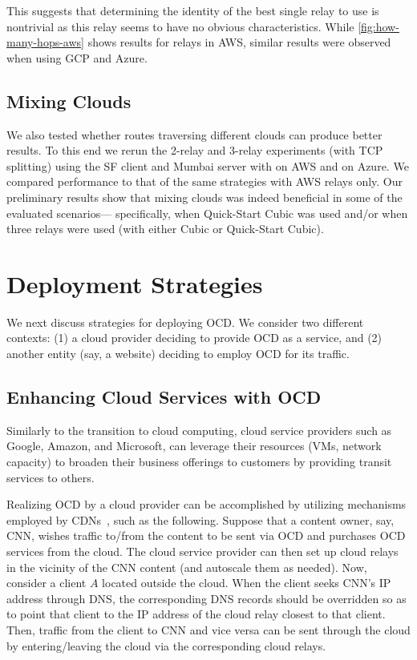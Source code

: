 \documentclass[10pt,sigconf]{acmart}
\begin{document}
This suggests that determining the identity of the best single relay to use is nontrivial as this relay seems to have no obvious characteristics. While \autoref{fig:how-many-hops-aws} shows results for relays in AWS, similar results were observed when using GCP and Azure.


\subsection{Mixing Clouds}

We also tested whether routes traversing different clouds can produce better results. To this end we rerun the 2-relay and 3-relay experiments (with TCP splitting) using the SF client and Mumbai server with \rc on AWS and \rs on Azure. We compared performance to that of the same strategies with AWS relays only. Our preliminary results show that mixing clouds was indeed beneficial in some of the evaluated scenarios--- specifically, when Quick-Start Cubic was used and/or when three relays were used (with either Cubic or Quick-Start Cubic). 


\section{Deployment Strategies}

We next discuss strategies for deploying OCD. We consider two different contexts: (1) a cloud provider deciding to provide OCD as a service, and (2) another entity (say, a website) deciding to employ OCD for its traffic.

\subsection{Enhancing Cloud Services with OCD}

Similarly to the transition to cloud computing, cloud service providers such as Google, Amazon, and Microsoft, can leverage their resources (VMs, network capacity) to broaden their business offerings to customers by providing transit services to others.

Realizing OCD by a cloud provider can be accomplished by utilizing mechanisms employed by CDNs~\cite{x,y,z}, such as the following. Suppose that a content owner, say, CNN, wishes traffic to/from the content to be sent via OCD and purchases OCD services from the cloud. The cloud service provider can then set up cloud relays in the vicinity of the CNN content (and autoscale them as needed). Now, consider a client $A$ located outside the cloud. When the client seeks CNN's IP address through DNS, the corresponding DNS records should be overridden so as to point that client to the IP address of the cloud relay closest to that client. Then, traffic from the client to CNN and vice versa can be sent through the cloud by entering/leaving the cloud via the corresponding cloud relays.
\end{document}

